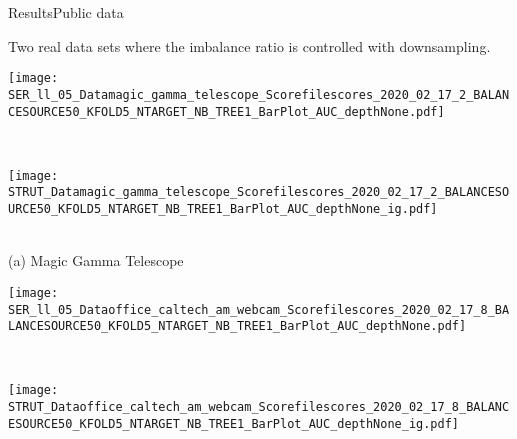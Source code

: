 \begin{frame}{Results}{Public data}

\centering
Two real data sets where the imbalance ratio is controlled with downsampling.


\renewcommand{\ratio}{0.9}
        \centering
        \begin{minipage}[t]{0.33\linewidth}\vspace{0pt}
            \centering
            \begin{minipage}[t]{\ratio\linewidth}\vspace{0pt}
            \centerline{\texttt{[image: SER\_ll\_05\_Datamagic\_gamma\_telescope\_Scorefilescores\_2020\_02\_17\_2\_BALANCESOURCE50\_KFOLD5\_NTARGET\_NB\_TREE1\_BarPlot\_AUC\_depthNone.pdf]}}
            \end{minipage}\\
            \begin{minipage}[t]{\ratio\linewidth}\vspace{0cm}
            \centerline{\texttt{[image: STRUT\_Datamagic\_gamma\_telescope\_Scorefilescores\_2020\_02\_17\_2\_BALANCESOURCE50\_KFOLD5\_NTARGET\_NB\_TREE1\_BarPlot\_AUC\_depthNone\_ig.pdf]}}
            \end{minipage}\\
            \medskip
            {\small(a)\; Magic Gamma Telescope}
        \end{minipage}\hfill
        \begin{minipage}[t]{0.33\linewidth}\vspace{0pt}
            \centering
            \begin{minipage}[t]{\ratio\linewidth}\vspace{0pt}
            \centerline{\texttt{[image: SER\_ll\_05\_Dataoffice\_caltech\_am\_webcam\_Scorefilescores\_2020\_02\_17\_8\_BALANCESOURCE50\_KFOLD5\_NTARGET\_NB\_TREE1\_BarPlot\_AUC\_depthNone.pdf]}}
            \end{minipage}\\
            \begin{minipage}[t]{\ratio\linewidth}\vspace{0cm}
            \centerline{\texttt{[image: STRUT\_Dataoffice\_caltech\_am\_webcam\_Scorefilescores\_2020\_02\_17\_8\_BALANCESOURCE50\_KFOLD5\_NTARGET\_NB\_TREE1\_BarPlot\_AUC\_depthNone\_ig.pdf]}}
            \end{minipage}\\

\end{minipage}
\end{frame}
